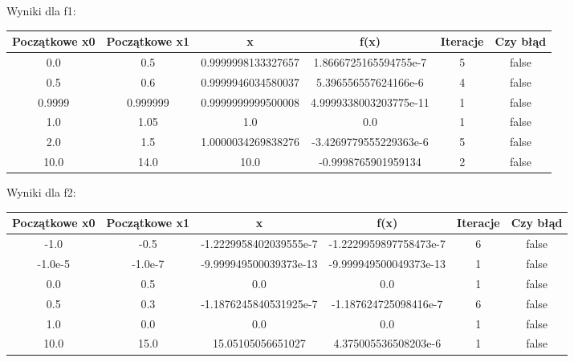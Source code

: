 \documentclass[15pt, a4paper]{article}
\begin{document}
\noindent Wyniki dla f1:
\begin{table}[ht]
\begin{adjustbox}{max width=\textwidth}
\begin{tabular}{|c|c|c|c|c|c|}
    \hline
    \textbf{Początkowe x0} & \textbf{Początkowe x1} & \textbf{x} & \textbf{f(x)} & \textbf{Iteracje} & \textbf{Czy błąd} \\
    \hline
    0.0 & 0.5 & 0.9999998133327657 & 1.8666725165594755e-7 & 5 & false \\
    \hline
    0.5 & 0.6 & 0.9999946034580037 & 5.396556557624166e-6 & 4 & false \\
    \hline
    0.9999 & 0.999999 & 0.9999999999500008 & 4.9999338003203775e-11 & 1 & false \\
    \hline
    1.0 & 1.05 & 1.0 & 0.0 & 1 & false \\
    \hline
    2.0 & 1.5 & 1.0000034269838276 & -3.4269779555229363e-6 & 5 & false \\
    \hline
    10.0 & 14.0 & 10.0 & -0.9998765901959134 & 2 & false \\
    \hline
\end{tabular}
\end{adjustbox}
\end{table}

\noindent Wyniki dla f2:
\begin{table}[ht]
\begin{adjustbox}{max width=\textwidth}
\begin{tabular}{|c|c|c|c|c|c|}
    \hline
    \textbf{Początkowe x0} & \textbf{Początkowe x1} & \textbf{x} & \textbf{f(x)} & \textbf{Iteracje} & \textbf{Czy błąd} \\
    \hline
    -1.0 & -0.5 & -1.2229958402039555e-7 & -1.2229959897758473e-7 & 6 & false \\
    \hline
    -1.0e-5 & -1.0e-7 & -9.999949500039373e-13 & -9.999949500049373e-13 & 1 & false \\
    \hline
    0.0 & 0.5 & 0.0 & 0.0 & 1 & false \\
    \hline
    0.5 & 0.3 & -1.1876245840531925e-7 & -1.187624725098416e-7 & 6 & false \\
    \hline
    1.0 & 0.0 & 0.0 & 0.0 & 1 & false \\
    \hline
    10.0 & 15.0 & 15.05105056651027 & 4.375005536508203e-6 & 1 & false \\
    \hline
\end{tabular}
\end{adjustbox}
\end{table}
\end{document}
